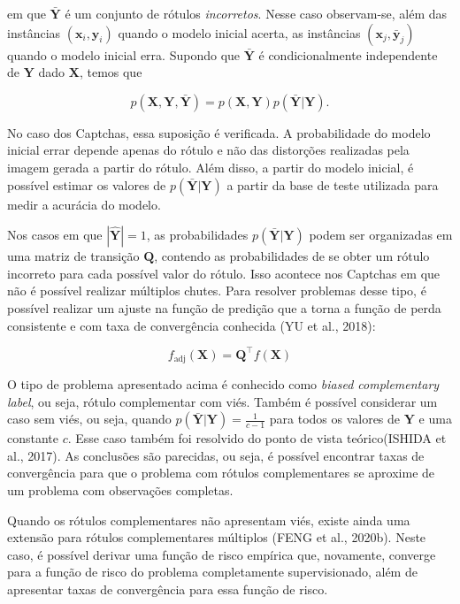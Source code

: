 \documentclass[12pt,twoside,brazilian]{book}
\begin{document}
em que \(\bar{\mathbf Y}\) é um conjunto de rótulos \emph{incorretos}.
Nesse caso observam-se, além das instâncias
\((\mathbf x_i,\mathbf y_i)\) quando o modelo inicial acerta, as
instâncias \((\mathbf x_j, \bar{\mathbf {y}}_j)\) quando o modelo
inicial erra. Supondo que \(\bar{\mathbf Y}\) é condicionalmente
independente de \({\mathbf Y}\) dado \({\mathbf X}\), temos que

\[
p(\mathbf X,\mathbf Y,\bar{\mathbf Y})=p(\mathbf X, \mathbf Y)p(\bar{\mathbf Y}|\mathbf Y).
\]

No caso dos Captchas, essa suposição é verificada. A probabilidade do
modelo inicial errar depende apenas do rótulo e não das distorções
realizadas pela imagem gerada a partir do rótulo. Além disso, a partir
do modelo inicial, é possível estimar os valores de
\(p(\bar{\mathbf Y}|\mathbf Y)\) a partir da base de teste utilizada
para medir a acurácia do modelo.

Nos casos em que \(|\hat{\mathbf Y}|=1\), as probabilidades
\(p(\bar{\mathbf Y}|\mathbf Y)\) podem ser organizadas em uma matriz de
transição \(\mathbf Q\), contendo as probabilidades de se obter um
rótulo incorreto para cada possível valor do rótulo. Isso acontece nos
Captchas em que não é possível realizar múltiplos chutes. Para resolver
problemas desse tipo, é possível realizar um ajuste na função de
predição que a torna a função de perda consistente e com taxa de
convergência conhecida (YU et al., 2018):

\[
f_{\text{adj}} (\mathbf X) = \mathbf Q ^{\top}f(\mathbf X)
\]

O tipo de problema apresentado acima é conhecido como \emph{biased
complementary label}, ou seja, rótulo complementar com viés. Também é
possível considerar um caso sem viés, ou seja, quando
\(p(\bar{\mathbf Y}|\mathbf Y) = \frac{1}{c-1}\) para todos os valores
de \(\mathbf Y\) e uma constante \(c\). Esse caso também foi resolvido
do ponto de vista teórico(ISHIDA et al., 2017). As conclusões são
parecidas, ou seja, é possível encontrar taxas de convergência para que
o problema com rótulos complementares se aproxime de um problema com
observações completas.

Quando os rótulos complementares não apresentam viés, existe ainda uma
extensão para rótulos complementares múltiplos (FENG et al., 2020b).
Neste caso, é possível derivar uma função de risco empírica que,
novamente, converge para a função de risco do problema completamente
supervisionado, além de apresentar taxas de convergência para essa
função de risco.
\end{document}
